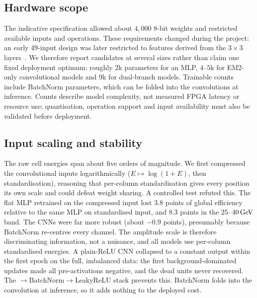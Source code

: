 \subsection{Hardware scope}
\label{app:hardware_scope}
The indicative specification allowed about $4{,}000$ 8-bit weights and restricted available inputs and operations. These requirements changed during the project: an early 49-input design was later restricted to features derived from the $3\times3$ layers~\cite{kernan2026}. We therefore report candidates at several sizes rather than claim one fixed deployment optimum: roughly $2$k parameters for an MLP, $4$--$5$k for EM2-only convolutional models and $9$k for dual-branch models. Trainable counts include BatchNorm parameters, which can be folded into the convolutions at inference. Counts describe model complexity, not measured FPGA latency or resource use; quantisation, operation support and input availability must also be validated before deployment.

\subsection{Input scaling and stability}
The raw cell energies span about five orders of magnitude. We first compressed the convolutional inputs logarithmically ($E\mapsto\log(1+E)$, then standardisation), reasoning that per-column standardisation gives every position its own scale and could defeat weight sharing. A controlled test refuted this. The flat MLP retrained on the compressed input lost $3.8$ points of global efficiency relative to the same MLP on standardised input, and $8.3$ points in the $25$--$40\,\mathrm{GeV}$ band. The CNNs were far more robust (about $-0.9$ points), presumably because BatchNorm re-centres every channel. The amplitude scale is therefore discriminating information, not a nuisance, and all models use per-column standardised energies. A plain-ReLU CNN collapsed to a constant output within the first epoch on the full, imbalanced data: the first background-dominated updates made all pre-activations negative, and the dead units never recovered. The $\to$BatchNorm$\to$LeakyReLU stack prevents this. BatchNorm folds into the convolution at inference, so it adds nothing to the deployed cost.

